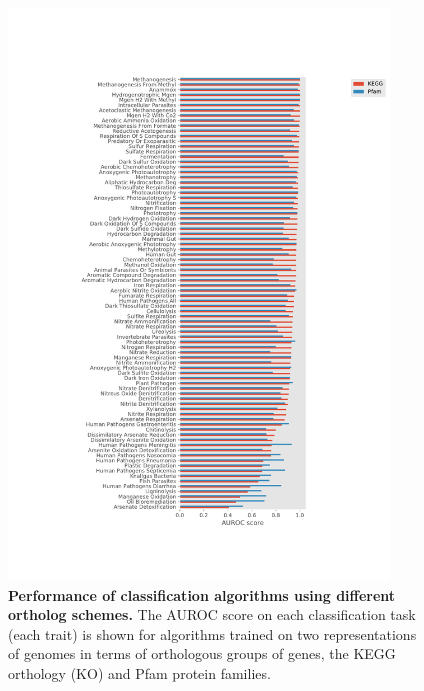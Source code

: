 \documentclass[10pt,letterpaper]{article}
\begin{document}
\begin{figure}[!h]
\includegraphics[width=0.9\textwidth]{orth_compare}
\caption{{\bf Performance of classification algorithms using different ortholog schemes.}
The AUROC score on each classification task (each trait) is shown for algorithms trained on two representations of genomes in terms of orthologous groups of genes, the KEGG orthology (KO) and Pfam protein families.}
\label{orth_comp}
\end{figure}
\end{document}
